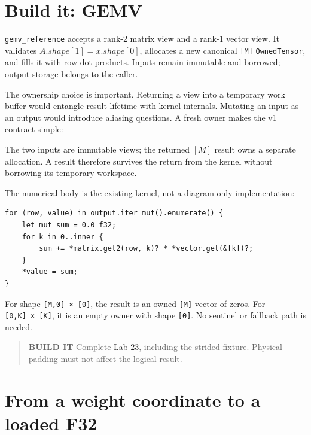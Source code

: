
\section{Build it: GEMV}\label{build-it-gemv}

\texttt{gemv\_reference} accepts a rank-2 matrix view and a rank-1
vector view. It validates \(A.shape[1]=x.shape[0]\), allocates a new
canonical \texttt{{[}M{]}} \texttt{OwnedTensor}, and fills it with row
dot products. Inputs remain immutable and borrowed; output storage
belongs to the caller.

The ownership choice is important. Returning a view into a temporary
work buffer would entangle result lifetime with kernel internals.
Mutating an input as an output would introduce aliasing questions. A
fresh owner makes the v1 contract simple:

The two inputs are immutable views; the returned $[M]$ result owns a separate allocation. A result therefore survives the return from the kernel without borrowing its temporary workspace.

The numerical body is the existing kernel, not a diagram-only
implementation:

\begin{verbatim}
for (row, value) in output.iter_mut().enumerate() {
    let mut sum = 0.0_f32;
    for k in 0..inner {
        sum += *matrix.get2(row, k)? * *vector.get(&[k])?;
    }
    *value = sum;
}
\end{verbatim}

For shape \texttt{{[}M,0{]}\ ×\ {[}0{]}}, the result is an owned
\texttt{{[}M{]}} vector of zeros. For \texttt{{[}0,K{]}\ ×\ {[}K{]}}, it
is an empty owner with shape \texttt{{[}0{]}}. No sentinel or fallback
path is needed.

\begin{quote}
\textbf{BUILD IT} Complete
\href{https://github.com/hermonai/inside-the-llm-engine/blob/astra-visual-rewrite/labs/lab-23-gemv-by-hand.md}{Lab
23}, including the strided fixture. Physical padding must not affect the
logical result.
\end{quote}

\section{From a weight coordinate to a loaded
F32}\label{from-a-weight-coordinate-to-a-loaded-f32}

